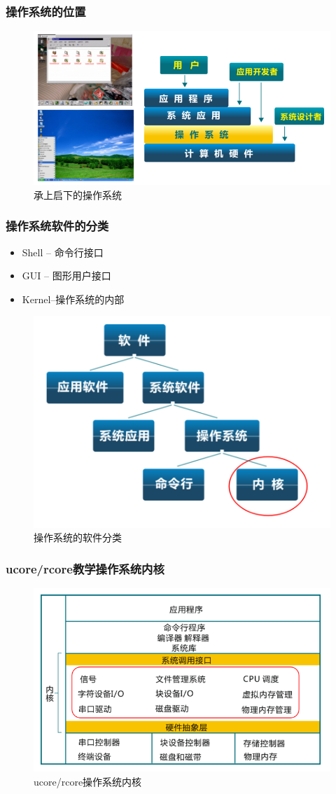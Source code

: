 \documentclass[UTF8]{ctexbeamer}
\begin{document}
\begin{frame}
	\frametitle{操作系统的位置}
\begin{figure}
	\centering
	\includegraphics[width=0.8\linewidth]{os-position}
	\caption{承上启下的操作系统}
\end{figure}
\end{frame}

\begin{frame}
	\frametitle{操作系统软件的分类}
		\begin{itemize}
		\item Shell -- 命令行接口
		\item GUI -- 图形用户接口
		\item Kernel--操作系统的内部
	\end{itemize}
	\begin{figure}
		\centering
		\includegraphics[width=0.6\linewidth]{sort-of-os}
		\caption{操作系统的软件分类}
	\end{figure}
\end{frame}

\begin{frame}
	\frametitle{ucore/rcore教学操作系统内核}
	\begin{figure}
		\centering
		\includegraphics[width=0.8\linewidth]{ucore-arch}
		\caption{ucore/rcore操作系统内核}
	\end{figure}
\end{frame}
\end{document}

